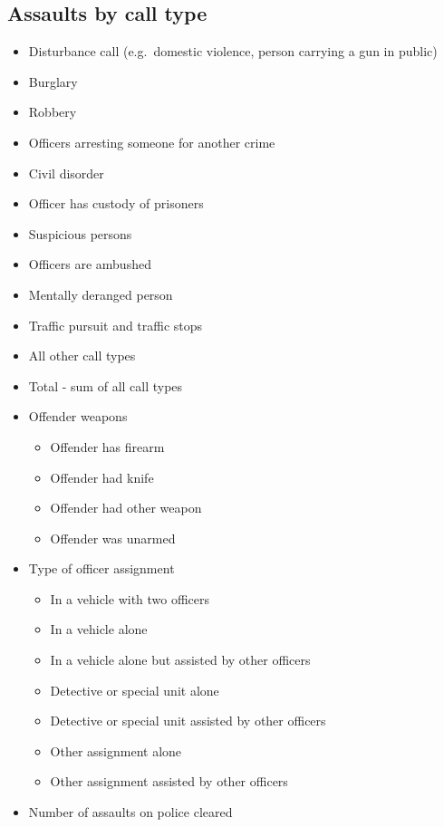 \documentclass[
  12pt,
  openany]{book}
\providecommand{\tightlist}{%
  \setlength{\itemsep}{0pt}\setlength{\parskip}{0pt}}
\begin{document}
\hypertarget{assaults-by-call-type}{%
\subsection{Assaults by call type}\label{assaults-by-call-type}}

\begin{itemize}
\item
  Disturbance call (e.g.~domestic violence, person carrying a gun in public)
\item
  Burglary
\item
  Robbery
\item
  Officers arresting someone for another crime
\item
  Civil disorder
\item
  Officer has custody of prisoners
\item
  Suspicious persons
\item
  Officers are ambushed
\item
  Mentally deranged person
\item
  Traffic pursuit and traffic stops
\item
  All other call types
\item
  Total - sum of all call types
\item
  Offender weapons

  \begin{itemize}
  \tightlist
  \item
    Offender has firearm
  \item
    Offender had knife
  \item
    Offender had other weapon
  \item
    Offender was unarmed
  \end{itemize}
\item
  Type of officer assignment

  \begin{itemize}
  \tightlist
  \item
    In a vehicle with two officers
  \item
    In a vehicle alone
  \item
    In a vehicle alone but assisted by other officers
  \item
    Detective or special unit alone
  \item
    Detective or special unit assisted by other officers
  \item
    Other assignment alone
  \item
    Other assignment assisted by other officers
  \end{itemize}
\item
  Number of assaults on police cleared
\end{itemize}
\end{document}
